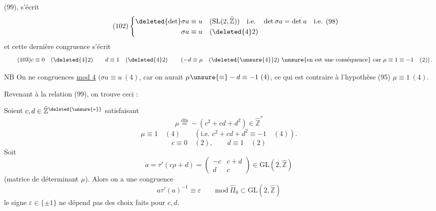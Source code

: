 
  (99),
 s'écrit
\[
\tag{102}
\left\{\begin{aligned}
\deleted{\det}\sigma a&\equiv u\quad
(\mathrm{SL}(2,\widehat{\mathbb Z}))\quad\text{i.e.}\quad
\det\sigma a=\det u\quad\text{i.e. (98)}\\
\sigma a&\equiv u\quad(\deleted{4}2)
\end{aligned}\right.
\]
 et cette dernière congruence s'écrit
\[
\tag{103}
c\equiv0\quad(\deleted{4}2)\qquad d\equiv1\quad(\deleted{4}2)
\qquad
\left(-d\equiv\mu\quad(\deleted{\unsure{4}}2)\ \text{\unsure{en est une conséquence}}
\ \text{car }\mu\equiv1\equiv-1\quad(2)\right).
\]

NB On ne  
congruences \uline{mod 4}
$(\sigma a\equiv u\ (4)$, car on aurait
$\mu\unsure{\equiv}-d\equiv-1\ (4)$, ce qui est contraire à l'hypothèse
(95) $\mu\equiv1\ (4)$.


Revenant à la relation (99), on trouve ceci :

  Soient
$c,d\in\widehat{\mathbb Z}^{\deleted{\unsure{*}}}$ satisfaisant
\[
\tag{104}
\mu\overset{\mathrm{dfn}}{=}-(c^2+cd+d^2)\in\widehat{\mathbb Z}^{*}
\]
\[
\tag{105}
\mu\equiv1\quad(4)\qquad
(\text{i.e. }c^2+cd+d^2\equiv-1\quad(4)).
\]
\[
\tag{106}
c\equiv0\quad(2),\qquad d\equiv1\quad(2)
\]
Soit  
\[
\tag{107}
a=\tau'(c\rho+d)=
\begin{pmatrix}-c&c+d\\d&c\end{pmatrix}
\in\mathrm{GL}(2,\widehat{\mathbb Z})
\]
(matrice de déterminant $\mu$). Alors on a une congruence
\[
\tag{108}
a\tau'(a)^{-1}\equiv\varepsilon\qquad
\mathrm{mod}\ \widehat{\Pi}_0\subset\mathrm{GL}(2,\widehat{\mathbb Z})
\]
 le signe $\varepsilon\in\{\pm1\}$ ne dépend pas des
choix faits pour $c,d$.

